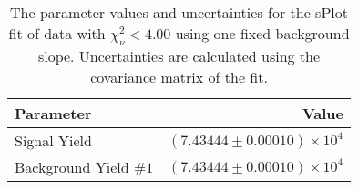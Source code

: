 
\begin{table}[ht]
    \begin{center}
        \begin{tabular}{lr}\toprule
            Parameter & Value \\\midrule
            Signal Yield & $(7.43444 \pm 0.00010) \times 10^{4}$ \\
            Background Yield $\#1$ & $(7.43444 \pm 0.00010) \times 10^{4}$ \\\bottomrule
        \end{tabular}
        \caption{The parameter values and uncertainties for the sPlot fit of data with $\chi^2_\nu < 4.00$ using one fixed background slope. Uncertainties are calculated using the covariance matrix of the fit.}\label{tab:splot-fit-results-chisqdof-4.00-fixed-1}
    \end{center}
\end{table}
